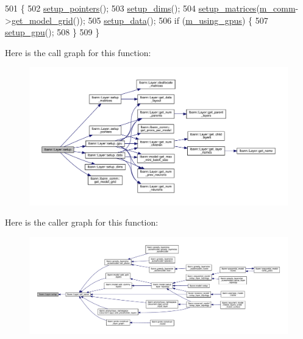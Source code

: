 \begin{DoxyCode}
501                   \{
502   \hyperlink{classlbann_1_1Layer_a71b7a62afd9b73c23b2c0267b8ba0981}{setup\_pointers}();
503   \hyperlink{classlbann_1_1Layer_a90fce1b06c1f2abb480e18cfe08a9746}{setup\_dims}();
504   \hyperlink{classlbann_1_1Layer_a57bbe21131dc00ab5cf9ea5e3656808e}{setup\_matrices}(\hyperlink{classlbann_1_1Layer_a5de05c52f22e0bbd7c703bec3ad4dbf2}{m\_comm}->\hyperlink{classlbann_1_1lbann__comm_a483bf8a72d44a0e83da45f3d47bd20d4}{get\_model\_grid}());
505   \hyperlink{classlbann_1_1Layer_a50a89f8a68762c677d48efe384676e81}{setup\_data}();
506   \textcolor{keywordflow}{if} (\hyperlink{classlbann_1_1Layer_af7881cb5eff5207c15fa835d65462e8f}{m\_using\_gpus}) \{
507     \hyperlink{classlbann_1_1Layer_a36aa22ef90ce4de65abe729d38490863}{setup\_gpu}();
508   \}
509 \}
\end{DoxyCode}
Here is the call graph for this function\+:\nopagebreak
\begin{figure}[H]
\begin{center}
\leavevmode
\includegraphics[width=350pt]{classlbann_1_1Layer_a93d6048c5959b27aa475673568dab956_cgraph}
\end{center}
\end{figure}
Here is the caller graph for this function\+:\nopagebreak
\begin{figure}[H]
\begin{center}
\leavevmode
\includegraphics[width=350pt]{classlbann_1_1Layer_a93d6048c5959b27aa475673568dab956_icgraph}
\end{center}
\end{figure}
\mbox{\label{classlbann_1_1Layer_a50a89f8a68762c677d48efe384676e81}} 
